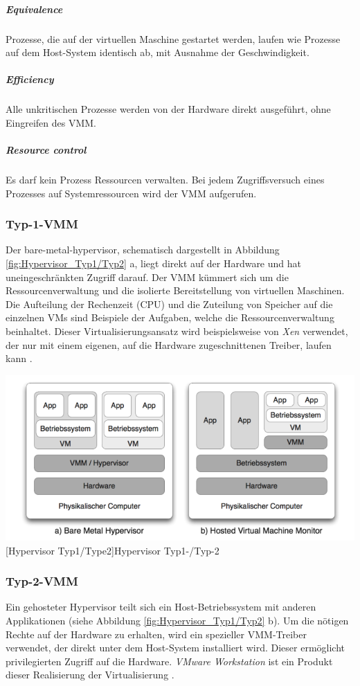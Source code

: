  \subparagraph{Equivalence} 
 Prozesse, die auf der virtuellen Maschine gestartet werden, laufen wie Prozesse auf dem  Host-System identisch ab, mit Ausnahme der Geschwindigkeit. 
 
\subparagraph{Efficiency} 
Alle unkritischen Prozesse werden von der Hardware direkt ausgeführt, ohne Eingreifen des VMM.

\subparagraph{Resource control} 
Es darf kein Prozess Ressourcen verwalten. Bei jedem Zugriffsversuch eines Prozesses auf Systemressourcen wird der VMM aufgerufen.



\subsubsection{Typ-1-VMM}
Der bare-metal-hypervisor, schematisch dargestellt in Abbildung \ref{fig:Hypervisor_Typ1/Typ2} a, liegt direkt auf der Hardware und hat uneingeschränkten Zugriff darauf. Der VMM kümmert sich um die Ressourcenverwaltung und die isolierte Bereitstellung von virtuellen Maschinen. Die Aufteilung der Rechenzeit (CPU) und die Zuteilung von Speicher auf die einzelnen VMs sind Beispiele der Aufgaben, welche die Ressourcenverwaltung beinhaltet. Dieser Virtualisierungsansatz wird beispielsweise von \emph{Xen} \cite{Install2018XenArchitecture} verwendet,  der nur mit einem eigenen, auf die Hardware zugeschnittenen Treiber, laufen kann \cite{Glatz2015Betriebssysteme}.

\vspace{1em}
\begin{minipage}{\linewidth}
	\centering
	\includegraphics[width=1\linewidth]{pics/Hypervisoren.PNG}
	[Hypervisor Typ1/Type2]{Hypervisor Typ1-/Typ-2 \cite{Meinel2011VirtualisierungMarktubersicht} }
	\label{fig:Hypervisor_Typ1/Typ2}
\end{minipage}

\subsubsection{Typ-2-VMM}
Ein gehosteter Hypervisor teilt sich ein Host-Betriebssystem mit anderen Applikationen (siehe Abbildung \ref{fig:Hypervisor_Typ1/Typ2} b). Um die nötigen Rechte auf der Hardware zu erhalten, wird ein spezieller VMM-Treiber verwendet, der direkt unter dem Host-System installiert wird. Dieser ermöglicht privilegierten Zugriff auf die Hardware. \emph{VMware Workstation} ist ein Produkt dieser Realisierung der Virtualisierung \cite{Glatz2015Betriebssysteme}.

